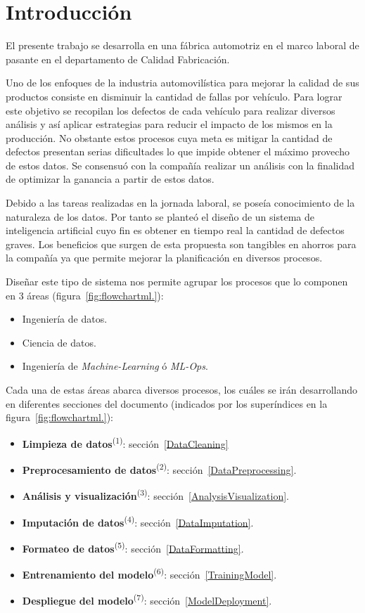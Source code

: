 \documentclass[a4paper,12pt]{article}
\begin{document}
\section{Introducción}
El presente trabajo se desarrolla en una fábrica automotriz en el marco laboral de pasante en el departamento de Calidad Fabricación.

Uno de los enfoques de la industria automovilística para mejorar la calidad de sus productos consiste en disminuir la cantidad de fallas por vehículo. Para lograr este objetivo se recopilan los defectos de cada vehículo para realizar diversos análisis y así aplicar estrategias para reducir el impacto de los mismos en la producción. No obstante estos procesos cuya meta es mitigar la cantidad de defectos presentan serias dificultades lo que impide obtener el máximo provecho de estos datos. Se consensuó con la compañía realizar un análisis con la finalidad de optimizar la ganancia a partir de estos datos.

Debido a las tareas realizadas en la jornada laboral, se poseía conocimiento de la naturaleza de los datos. Por tanto se planteó el diseño de un sistema de inteligencia artificial cuyo fin es obtener en tiempo real la cantidad de defectos graves. Los beneficios que surgen de esta propuesta son tangibles en ahorros para la compañía ya que permite mejorar la planificación en diversos procesos.

Diseñar este tipo de sistema nos permite agrupar los procesos que lo componen en 3 áreas (figura~\ref{fig:flowchartml.}):
\begin{itemize}[noitemsep, topsep=2pt]
	\item Ingeniería de datos.
	\item Ciencia de datos.
	\item Ingeniería de \textit{Machine-Learning} ó \textit{ML-Ops}.
\end{itemize}

Cada una de estas áreas abarca diversos procesos, los cuáles se irán desarrollando en diferentes secciones del documento (indicados por los superíndices en la figura~\ref{fig:flowchartml.}):
\begin{itemize}
	\item \textbf{Limpieza de datos}\textsuperscript{(1)}: sección~\ref{DataCleaning}
	\item \textbf{Preprocesamiento de datos}\textsuperscript{(2)}: sección~\ref{DataPreprocessing}.
	\item \textbf{Análisis y visualización}\textsuperscript{(3)}: sección~\ref{AnalysisVisualization}.
	\item \textbf{Imputación de datos}\textsuperscript{(4)}: sección~\ref{DataImputation}.
	\item \textbf{Formateo de datos}\textsuperscript{(5)}: sección~\ref{DataFormatting}.
	\item \textbf{Entrenamiento del modelo}\textsuperscript{(6)}: sección~\ref{TrainingModel}.
	\item \textbf{Despliegue del modelo}\textsuperscript{(7)}: sección~\ref{ModelDeployment}.
\end{itemize}
\end{document}
